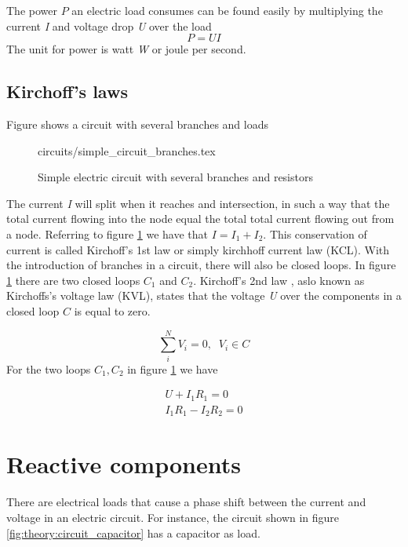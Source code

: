 \documentclass[class=book, crop=false]{standalone}
\begin{document}
The power $P$ an electric load consumes can be found easily by multiplying the current \textit{I} and voltage drop \textit{U} over the load
\begin{equation}\label{eq:theory:apparent_power}
    P = UI
\end{equation}
The unit for power is watt \textit{W} or joule per second.

\subsection{Kirchoff's laws}
Figure shows a circuit with several branches and loads 

\begin{figure}[ht!]
    \centering
    {circuits/simple_circuit_branches.tex}
    \caption{Simple electric circuit with several branches and resistors}
    \label{fig:theory:simple_circuit_branches}
\end{figure}

The current \textit{I} will split when it reaches and intersection, in such a way that the total current flowing into the node equal the total total current flowing out from a node. Referring to figure \ref{fig:theory:simple_circuit_branches} we have that $I = I_1 + I_2$. This conservation of current is called Kirchoff's 1st law or simply kirchhoff current law (KCL). With the introduction of branches in a circuit, there will also be closed loops. In figure \ref{fig:theory:simple_circuit_branches} there are two closed loops $C_{1}$ and $C_{2}$. Kirchoff's 2nd law , aslo known as Kirchoffs's voltage law (KVL), states that the voltage \textit{U} over the components in a closed loop $C$ is equal to zero. 

\begin{equation}\label{eq:theory:kirchoffs_2nd_integral}
    \sum_{i}^{N} V_{i} = 0, \;\; V_{i} \in C
\end{equation}
For the two loops $C_1,C_2$ in figure \ref{fig:theory:simple_circuit_branches} we have 


\begin{equation}
   \begin{aligned}\label{eq:theory:krirchoffs_2nd_ex}
    U + I_{1}R_{1} = 0 
    \\
    I_{1}R_{1} - I_{2}R_{2} = 0
\end{aligned} 
\end{equation}

\section{Reactive components}
There are electrical loads that cause a phase shift between the current and voltage in an electric circuit. For instance, the circuit shown in figure \ref{fig:theory:circuit_capacitor} has a capacitor as load.
\end{document}
